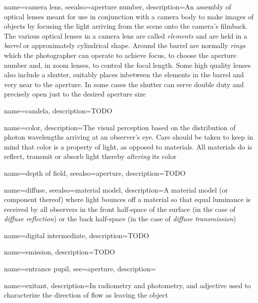 {
	name={camera lens},
	seealso={aperture number},
	description={An assembly of optical lenses meant for use in conjunction with a 
		camera body to make images of objects by focusing the light arriving from the scene
		onto the camera's filmback. 
		The various optical lenses in a camera lens are called \textsl{elements} and 
		are held in a \textsl{barrel} or approximately cylindrical shape.
		Around the barrel are normally \textsl{rings} which the photographer can
		operate to achieve focus, to choose the aperture number and, in zoom lenses, to
		control the focal length.
		Some high quality lenses also include a shutter, suitably places inbetween the
		elements in the barrel and very near to the aperture. In some cases the shutter 
		can serve double duty and precisely open just to the desired aperture size}
}

{
	name={candela},
	description={TODO}
}

{
	name={color},
	description={The visual perception based on the distribution of photon wavelengths arriving
		at an observer's eye. Care should be taken to keep in mind that color is a property of
		light, as opposed to materials. All materials do is reflect, transmit or absorb light
		thereby \emph{altering} its color}
}

{
	name={depth of field},
	seealso={aperture},
	description={TODO}
}

{
	name={diffuse},
	seealso={material model},
	description={A material model (or component thereof) where light bounces off a material
		so that equal luminance is received by all observers in the front half-space of the
		surface (in the case of \textsl{diffuse reflection}) or the back half-space (in the
		case of \textsl{diffuse transmission})}
}

{
	name={digital intermediate},
	description={TODO}
}

{
	name={emission},
	description={TODO}
}

{
	name={entrance pupil},
	see={aperture},
	description=\nopostdesc
}

{
	name={exitant},
	description={In radiometry and photometry, and adjective used to characterize the direction of
		flow as leaving the object}
}


